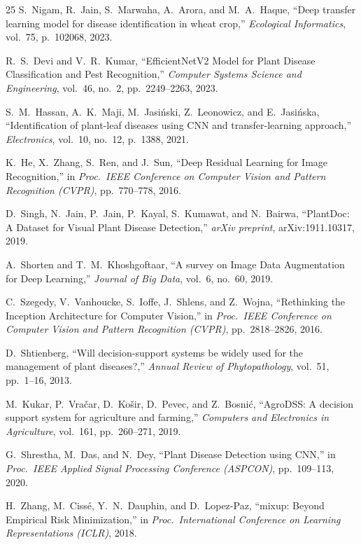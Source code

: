 \documentclass[12pt,a4paper]{report}
\begin{document}
\begin{thebibliography}{25}
S.~Nigam, R.~Jain, S.~Marwaha, A.~Arora, and M.~A.~Haque,
``Deep transfer learning model for disease identification in wheat crop,''
\textit{Ecological Informatics}, vol.~75, p.~102068, 2023.

R.~S.~Devi and V.~R.~Kumar,
``EfficientNetV2 Model for Plant Disease Classification and Pest Recognition,''
\textit{Computer Systems Science and Engineering}, vol.~46, no.~2, pp.~2249--2263, 2023.

S.~M.~Hassan, A.~K.~Maji, M.~Jasi\'{n}ski, Z.~Leonowicz, and E.~Jasi\'{n}ska,
``Identification of plant-leaf diseases using CNN and transfer-learning approach,''
\textit{Electronics}, vol.~10, no.~12, p.~1388, 2021.

K.~He, X.~Zhang, S.~Ren, and J.~Sun,
``Deep Residual Learning for Image Recognition,''
in \textit{Proc.\ IEEE Conference on Computer Vision and Pattern Recognition (CVPR)}, pp.~770--778, 2016.

D.~Singh, N.~Jain, P.~Jain, P.~Kayal, S.~Kumawat, and N.~Bairwa,
``PlantDoc: A Dataset for Visual Plant Disease Detection,''
\textit{arXiv preprint}, arXiv:1911.10317, 2019.

A.~Shorten and T.~M.~Khoshgoftaar,
``A survey on Image Data Augmentation for Deep Learning,''
\textit{Journal of Big Data}, vol.~6, no.~60, 2019.

C.~Szegedy, V.~Vanhoucke, S.~Ioffe, J.~Shlens, and Z.~Wojna,
``Rethinking the Inception Architecture for Computer Vision,''
in \textit{Proc.\ IEEE Conference on Computer Vision and Pattern Recognition (CVPR)}, pp.~2818--2826, 2016.

D.~Shtienberg,
``Will decision-support systems be widely used for the management of plant diseases?,''
\textit{Annual Review of Phytopathology}, vol.~51, pp.~1--16, 2013.

M.~Kukar, P.~Vra\v{c}ar, D.~Ko\v{s}ir, D.~Pevec, and Z.~Bosni\'{c},
``AgroDSS: A decision support system for agriculture and farming,''
\textit{Computers and Electronics in Agriculture}, vol.~161, pp.~260--271, 2019.

G.~Shrestha, M.~Das, and N.~Dey,
``Plant Disease Detection using CNN,''
in \textit{Proc.\ IEEE Applied Signal Processing Conference (ASPCON)}, pp.~109--113, 2020.

H.~Zhang, M.~Ciss\'{e}, Y.~N.~Dauphin, and D.~Lopez-Paz,
``mixup: Beyond Empirical Risk Minimization,''
in \textit{Proc.\ International Conference on Learning Representations (ICLR)}, 2018.


\end{thebibliography}
\end{document}
